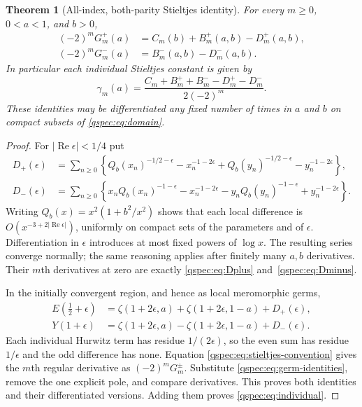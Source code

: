 \documentclass[11pt,letterpaper]{article}
\numberwithin{equation}{section}
\newtheorem{theorem}{Theorem}[section]
\theoremstyle{definition}
\newcommand{\Rea}{\operatorname{Re}}
\begin{document}
\begin{theorem}[All-index, both-parity Stieltjes identity]
\label{qspec:thm:master}
For every $m\ge0$, $0<a<1$, and $b>0$,
\begin{align}
(-2)^mG_m^+(a)&=C_m(b)+B_m^+(a,b)-D_m^+(a,b),\label{qspec:eq:master-plus}\\
(-2)^mG_m^-(a)&=B_m^-(a,b)-D_m^-(a,b).\label{qspec:eq:master-minus}
\end{align}
In particular each individual Stieltjes constant is given by
\begin{equation}\label{qspec:eq:individual}
\gamma_m(a)=\frac{C_m+B_m^++B_m^--D_m^+-D_m^-}{2(-2)^m}.
\end{equation}
These identities may be differentiated any fixed number of times in $a$
and $b$ on compact subsets of \eqref{qspec:eq:domain}.
\end{theorem}
\begin{proof}
For $|\Rea\epsilon|<1/4$ put
\begin{align*}
D_+(\epsilon)&=\sum_{n\ge0}\left\{
Q_b(x_n)^{-1/2-\epsilon}-x_n^{-1-2\epsilon}
+Q_b(y_n)^{-1/2-\epsilon}-y_n^{-1-2\epsilon}\right\},\\
D_-(\epsilon)&=\sum_{n\ge0}\left\{
x_nQ_b(x_n)^{-1-\epsilon}-x_n^{-1-2\epsilon}
-y_nQ_b(y_n)^{-1-\epsilon}+y_n^{-1-2\epsilon}\right\}.
\end{align*}
Writing $Q_b(x)=x^2(1+b^2/x^2)$ shows that each local difference
is $O(x^{-3+2|\Rea\epsilon|})$, uniformly on compact sets of the
parameters and of $\epsilon$. Differentiation in $\epsilon$ introduces
at most fixed powers of $\log x$. The resulting series converge normally;
the same reasoning applies after finitely many $a,b$ derivatives.
Their $m$th derivatives at zero are exactly
\eqref{qspec:eq:Dplus} and~\eqref{qspec:eq:Dminus}.

In the initially convergent region, and hence as local meromorphic germs,
\begin{align}
E(\tfrac12+\epsilon)&=
\zeta(1+2\epsilon,a)+\zeta(1+2\epsilon,1-a)+D_+(\epsilon),\label{qspec:eq:even-subtraction}\\
Y(1+\epsilon)&=
\zeta(1+2\epsilon,a)-\zeta(1+2\epsilon,1-a)+D_-(\epsilon).
\label{qspec:eq:odd-subtraction}
\end{align}
Each individual Hurwitz term has residue $1/(2\epsilon)$, so the even
sum has residue $1/\epsilon$ and the odd difference has none. Equation
\eqref{qspec:eq:stieltjes-convention} gives the $m$th regular derivative
as $(-2)^mG_m^\pm$. Substitute \eqref{qspec:eq:germ-identities}, remove
the one explicit pole, and compare derivatives. This proves both
identities and their differentiated versions. Adding them proves
\eqref{qspec:eq:individual}.
\end{proof}
\end{document}
